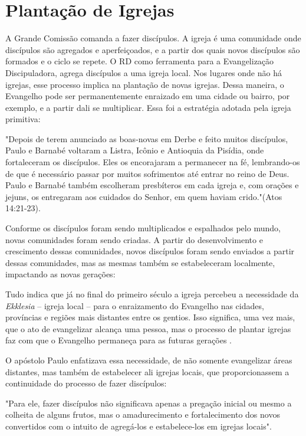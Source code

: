 \documentclass[12pt,openright,oneside,a4paper]{abntex2}
\begin{document}
\section{Plantação de Igrejas}

A Grande Comissão comanda a fazer discípulos. A igreja é uma comunidade onde discípulos são agregados e aperfeiçoados, e a partir dos quais novos discípulos são formados e o ciclo se repete. O RD como ferramenta para a Evangelização Discipuladora, agrega discípulos a uma igreja local. Nos lugares onde não há igrejas, esse processo implica na plantação de novas igrejas. Dessa maneira, o Evangelho pode ser permanentemente enraizado em uma cidade ou bairro, por exemplo, e a partir dali se multiplicar\cite[p. 99,100]{brandao}. Essa foi a estratégia adotada pela igreja primitiva: 

\begin{citacao}"Depois de terem anunciado as boas-novas em Derbe e feito muitos discípulos, Paulo e Barnabé voltaram a Listra, Icônio e Antioquia da Pisídia, onde fortaleceram os discípulos. Eles os encorajaram a permanecer na fé, lembrando-os de que é necessário passar por muitos sofrimentos até entrar no reino de Deus. Paulo e Barnabé também escolheram presbíteros em cada igreja e, com orações e jejuns, os entregaram aos cuidados do Senhor, em quem haviam crido."(Atos 14:21-23).\end{citacao}

Conforme os discípulos foram sendo multiplicados e espalhados pelo mundo, novas comunidades foram sendo criadas. A partir do desenvolvimento e crescimento dessas comunidades, novos discípulos foram sendo enviados a partir dessas comunidades, mas as mesmas também se estabeleceram localmente, impactando as novas gerações:

\begin{citacao}Tudo indica que já no final do primeiro século a igreja percebeu a necessidade da \textit{Ekklesia} – igreja local – para o enraizamento do Evangelho nas cidades, províncias e regiões mais distantes entre os gentios. Isso significa, uma vez mais, que o ato de evangelizar alcança uma pessoa, mas o processo de plantar igrejas	faz com que o Evangelho permaneça para as futuras gerações \cite[p. 101]{brandao}.\end{citacao}

O apóstolo Paulo enfatizava essa necessidade, de não somente evangelizar áreas distantes, mas também de estabelecer ali igrejas locais, que proporcionassem a continuidade do processo de fazer discípulos: \begin{citacao}"Para ele, fazer discípulos não significava apenas a pregação inicial ou mesmo a colheita de alguns frutos, mas o amadurecimento e fortalecimento dos novos convertidos com o intuito de agregá-los e estabelece-los em igrejas locais"\cite[p. 101]{brandao}.\end{citacao}
\end{document}
